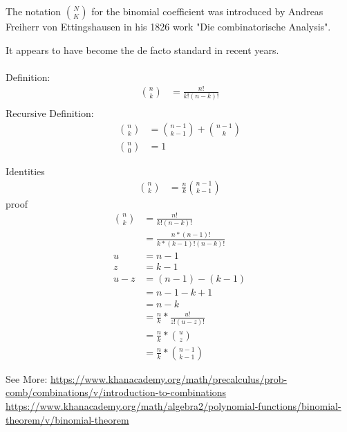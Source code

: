 \documentclass[]{article}
\begin{document}
	
	The notation $\binom{N}{K}$ for the binomial coefficient was introduced by Andreas Freiherr von Ettingshausen in his 1826 work "Die combinatorische Analysis".
	
	It appears to have become the de facto standard in recent years.\\
	\\
	Definition:
\begin{align}
	\binom{n}{k} &= \frac {n!}{k!(n-k)!}\\
\end{align}
	Recursive Definition:
\begin{align}
	\binom{n}{k} &= \binom{n - 1}{k - 1} + \binom{n - 1}{k}\\ 
	\binom{n}{0} &= 1
\end{align}

Identities 
\begin{align}
	\binom{n}{k} &= \frac {n}{k} \binom{n-1}{k-1}
\end{align}
proof
\begin{align}
	\binom{n}{k} &= \frac {n!}{k!(n-k)!}\\
	&= \frac{n*(n-1)!}{k*(k-1)!(n-k)!}\\
	u &= n-1\\
	z &= k-1\\
	u-z &= (n-1)-(k-1)\\
	&= n-1-k+1\\
	&= n-k\\
	&= \frac{n}{k} * \frac {u!}{z!(u-z)!}\\
	&= \frac{n}{k} * \binom{u}{z}\\
	&= \frac{n}{k} * \binom{n-1}{k-1}
\end{align}


See More:
\url{https://www.khanacademy.org/math/precalculus/prob-comb/combinations/v/introduction-to-combinations}
\url{https://www.khanacademy.org/math/algebra2/polynomial-functions/binomial-theorem/v/binomial-theorem}\\
\end{document}

